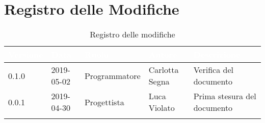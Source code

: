 \newpage

\section*{Registro delle Modifiche}

\begin{center}
\begin{longtable}[c]{|m{}|m{}|m{}|m{}|p{}|}
\hline
\rowcolor{bluelogo}\textbf{\textcolor{white}{Versione}} & \textbf{\textcolor{white}{Data}} & \textbf{\textcolor{white}{Ruolo}} & \textbf{\textcolor{white}{Autore}} & \textbf{\textcolor{white}{Descrizione}}\\
\endfirsthead
\hline \hline
\rowcolor{grigio} 0.1.0 & 2019-05-02 & Programmatore & Carlotta Segna & Verifica del documento \\
\hline
0.0.1 & 2019-04-30 & Progettista & Luca Violato & Prima stesura del documento\\
\hline
\caption{Registro delle modifiche}
\end{longtable}
\end{center}
